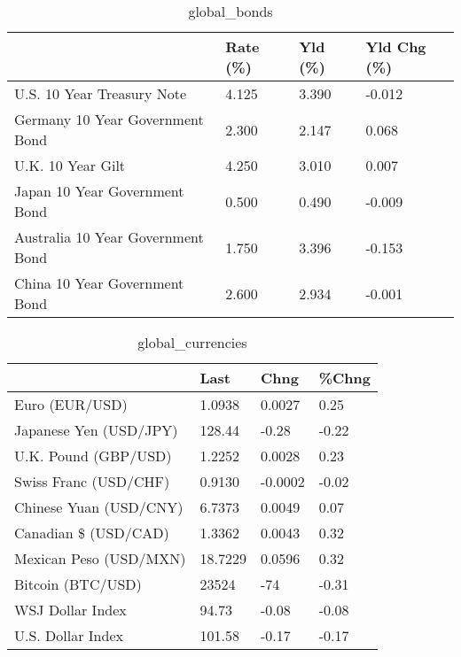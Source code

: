 \documentclass{article}%
\begin{document}
%


\begin{table}[htbp]%
\caption{global\_bonds}%
\centering%
\begin{adjustbox}{width=1\textwidth}%
\begin{tabular}{llll}
\toprule
                                  & Rate (\%) & Yld (\%) & Yld Chg (\%) \\
\midrule
       U.S. 10 Year Treasury Note &    4.125 &   3.390 &      -0.012 \\
  Germany 10 Year Government Bond &    2.300 &   2.147 &       0.068 \\
                U.K. 10 Year Gilt &    4.250 &   3.010 &       0.007 \\
    Japan 10 Year Government Bond &    0.500 &   0.490 &      -0.009 \\
Australia 10 Year Government Bond &    1.750 &   3.396 &      -0.153 \\
    China 10 Year Government Bond &    2.600 &   2.934 &      -0.001 \\
\bottomrule
\end{tabular}
%
\end{adjustbox}%
\end{table}

%


\begin{table}[htbp]%
\caption{global\_currencies}%
\centering%
\begin{adjustbox}{width=1\textwidth}%
\begin{tabular}{llll}
\toprule
                       &    Last &    Chng & \%Chng \\
\midrule
        Euro (EUR/USD) &  1.0938 &  0.0027 &  0.25 \\
Japanese Yen (USD/JPY) &  128.44 &   -0.28 & -0.22 \\
  U.K. Pound (GBP/USD) &  1.2252 &  0.0028 &  0.23 \\
 Swiss Franc (USD/CHF) &  0.9130 & -0.0002 & -0.02 \\
Chinese Yuan (USD/CNY) &  6.7373 &  0.0049 &  0.07 \\
  Canadian \$ (USD/CAD) &  1.3362 &  0.0043 &  0.32 \\
Mexican Peso (USD/MXN) & 18.7229 &  0.0596 &  0.32 \\
     Bitcoin (BTC/USD) &   23524 &     -74 & -0.31 \\
      WSJ Dollar Index &   94.73 &   -0.08 & -0.08 \\
     U.S. Dollar Index &  101.58 &   -0.17 & -0.17 \\
\bottomrule
\end{tabular}
%
\end{adjustbox}%
\end{table}
\end{document}
